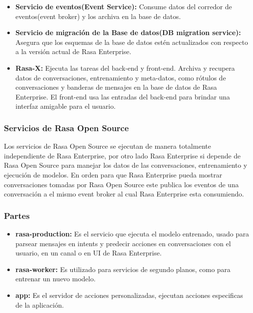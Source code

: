 \begin{itemize}
	\item \textbf{Servicio de eventos(Event Service):} Consume datos del corredor de eventos(event broker) y los archiva en la base de datos.
	\item \textbf{Servicio de migración de la Base de datos(DB migration service):}  Asegura que
	      los esquemas de la base de datos
	      estén actualizados con respecto a la versión actual de Rasa Enterprise.
	\item \textbf{Rasa-X:} Ejecuta las tareas del back-end y front-end. Archiva y recupera datos de
	      conversaciones, entrenamiento y meta-datos, como rótulos de conversaciones y banderas de
	      mensajes en la base de datos de Rasa Enterprise. El front-end usa las entradas del back-end para brindar
	      una interfaz amigable para el usuario.
\end{itemize}

\subsubsection{Servicios de Rasa Open Source}

Los servicios de Rasa Open Source se ejecutan de manera totalmente independiente de Rasa
Enterprise,
por otro lado Rasa Enterprise si depende de Rasa Open Source para manejar los datos de las
conversaciones,
entrenamiento y ejecución de modelos. En orden para que Rasa Enterprise pueda mostrar
conversaciones
tomadas por Rasa Open Source este publica los eventos de una conversación a el mismo event broker
al cual Rasa Enterprise esta consumiendo.

\subsubsection{Partes}

\begin{itemize}
	\item \textbf{rasa-production:} Es el servicio que ejecuta el modelo entrenado, usado para
	      parsear mensajes en intents y predecir acciones en conversaciones con el usuario, en un canal
	      o
	      en UI de Rasa Enterprise.
	\item \textbf{rasa-worker:} Es utilizado para servicios de segundo planos, como para entrenar
	      un
	      nuevo modelo.
	\item \textbf{app:} Es el servidor de acciones personalizadas, ejecutan acciones especificas
	      de la aplicación.
\end{itemize}

